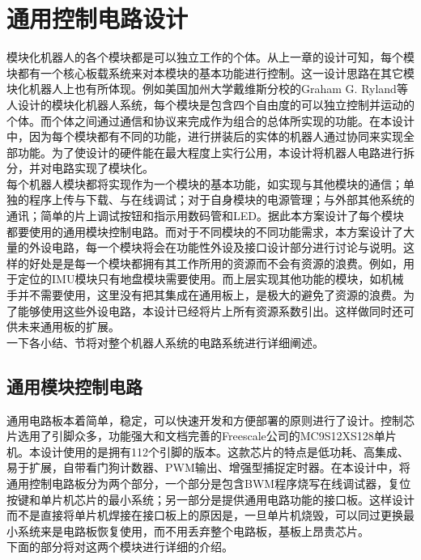 

\chapter{通用控制电路设计}
\label{chap:electricalSystem}
模块化机器人的各个模块都是可以独立工作的个体。从上一章的设计可知，每个模块都有一个核心板载系统来对本模块的基本功能进行控制。这一设计思路在其它模块化机器人上也有所体现。例如美国加州大学戴维斯分校的Graham G. Ryland等人设计的模块化机器人系统，每个模块是包含四个自由度的可以独立控制并运动的个体。而个体之间通过通信和协议来完成作为组合的总体所实现的功能。在本设计中，因为每个模块都有不同的功能，进行拼装后的实体的机器人通过协同来实现全部功能。为了使设计的硬件能在最大程度上实行公用，本设计将机器人电路进行拆分，并对电路实现了模块化。 \\
每个机器人模块都将实现作为一个模块的基本功能，如实现与其他模块的通信；单独的程序上传与下载、与在线调试；对于自身模块的电源管理；与外部其他系统的通讯；简单的片上调试按钮和指示用数码管和LED。据此本方案设计了每个模块都要使用的通用模块控制电路。而对于不同模块的不同功能需求，本方案设计了大量的外设电路，每一个模块将会在功能性外设及接口设计部分进行讨论与说明。这样的好处是是每一个模块都拥有其工作所用的资源而不会有资源的浪费。例如，用于定位的IMU模块只有地盘模块需要使用。而上层实现其他功能的模块，如机械手并不需要使用，这里没有把其集成在通用板上，是极大的避免了资源的浪费。为了能够使用这些外设电路，本设计已经将片上所有资源系数引出。这样做同时还可供未来通用板的扩展。 \\
一下各小结、节将对整个机器人系统的电路系统进行详细阐述。 \\
\section{通用模块控制电路}
通用电路板本着简单，稳定，可以快速开发和方便部署的原则进行了设计。控制芯片选用了引脚众多，功能强大和文档完善的Freescale公司的MC9S12XS128单片机。本设计使用的是拥有112个引脚的版本。这款芯片的特点是低功耗、高集成、易于扩展，自带看门狗计数器、PWM输出、增强型捕捉定时器。在本设计中，将通用控制电路板分为两个部分，一个部分是包含BWM程序烧写在线调试器，复位按键和单片机芯片的最小系统；另一部分是提供通用电路功能的接口板。这样设计而不是直接将单片机焊接在接口板上的原因是，一旦单片机烧毁，可以同过更换最小系统来是电路板恢复使用，而不用丢弃整个电路板，基板上昂贵芯片。 \\
下面的部分将对这两个模块进行详细的介绍。 \\
